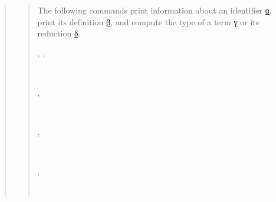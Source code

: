 \documentclass[a4paper]{article}
\begin{document}
\begin{quote}
\begin{quote}
The following commands print information about an identifier \hyperref[references-rst-cp-s-about0]{α}, print its definition \hyperref[references-rst-cp-s-print0]{β}, and compute the type of a term \hyperref[references-rst-cp-s-check0]{γ} or its reduction \hyperref[references-rst-cp-s-compute0]{δ}.

\begin{alectryon}
  \sep
  \sep
  \begin{sentence}
    \begin{input}
      ~
    \end{input}
    \sep
    \begin{output}
      \begin{messages}
        \begin{message}
          ~~~~~~\nl
          \nl
          ~~~~\nl
          ~~~\nl
          ~~\nl
          ~~~
        \end{message}
      \end{messages}
    \end{output}
  \end{sentence}
  \sep
  \begin{sentence}
    \begin{input}
      ~
    \end{input}
    \sep
    \begin{output}
      \begin{messages}
        \begin{message}
          ~~\nl
          ~~~~~~~~~~\nl

\end{message}
\end{messages}
\end{output}
\end{sentence}
\end{alectryon}
\end{quote}
\end{quote}
\end{document}

